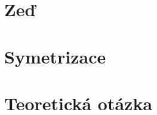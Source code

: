 \documentclass{article}
\begin{document}



\maketitle
\tableofcontents
\newpage



\section{Zeď}



\section{Symetrizace}



\section{Teoretická otázka}
\end{document}
